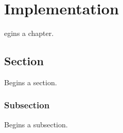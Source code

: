\let\textcircled=\pgftextcircled
\chapter{Implementation}
\label{chap:implementation}

egins a chapter. 

\section{Section}
\label{sec:sec01}

Begins a section.

\subsection{Subsection}
\label{subsec:subsec01}

Begins a subsection.